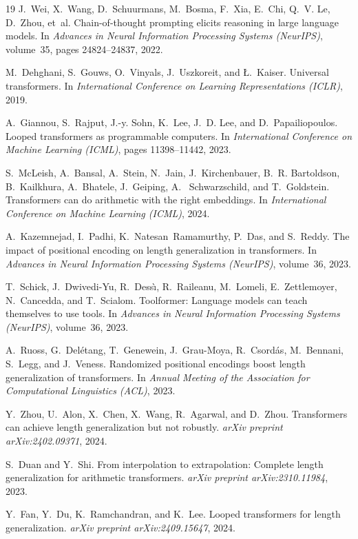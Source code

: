 \documentclass[10pt,twocolumn]{article}
\begin{document}
\begin{thebibliography}{19}
J.~Wei, X.~Wang, D.~Schuurmans, M.~Bosma, F.~Xia, E.~Chi, Q.~V. Le, D.~Zhou, et~al.
\newblock Chain-of-thought prompting elicits reasoning in large language models.
\newblock In \emph{Advances in Neural Information Processing Systems (NeurIPS)}, volume~35, pages 24824--24837, 2022.

M.~Dehghani, S.~Gouws, O.~Vinyals, J.~Uszkoreit, and \L.~Kaiser.
\newblock Universal transformers.
\newblock In \emph{International Conference on Learning Representations (ICLR)}, 2019.

A.~Giannou, S.~Rajput, J.-y. Sohn, K.~Lee, J.~D. Lee, and D.~Papailiopoulos.
\newblock Looped transformers as programmable computers.
\newblock In \emph{International Conference on Machine Learning (ICML)}, pages 11398--11442, 2023.

S.~McLeish, A.~Bansal, A.~Stein, N.~Jain, J.~Kirchenbauer, B.~R. Bartoldson, B.~Kailkhura, A.~Bhatele, J.~Geiping, A.~ Schwarzschild, and T.~Goldstein.
\newblock Transformers can do arithmetic with the right embeddings.
\newblock In \emph{International Conference on Machine Learning (ICML)}, 2024.

A.~Kazemnejad, I.~Padhi, K.~Natesan~Ramamurthy, P.~Das, and S.~Reddy.
\newblock The impact of positional encoding on length generalization in transformers.
\newblock In \emph{Advances in Neural Information Processing Systems (NeurIPS)}, volume~36, 2023.

T.~Schick, J.~Dwivedi-Yu, R.~Dess{\`\i}, R.~Raileanu, M.~Lomeli, E.~Zettlemoyer, N.~Cancedda, and T.~Scialom.
\newblock Toolformer: Language models can teach themselves to use tools.
\newblock In \emph{Advances in Neural Information Processing Systems (NeurIPS)}, volume~36, 2023.

A.~Ruoss, G.~Del{\'e}tang, T.~Genewein, J.~Grau-Moya, R.~Csord{\'a}s, M.~Bennani, S.~Legg, and J.~Veness.
\newblock Randomized positional encodings boost length generalization of transformers.
\newblock In \emph{Annual Meeting of the Association for Computational Linguistics (ACL)}, 2023.

Y.~Zhou, U.~Alon, X.~Chen, X.~Wang, R.~Agarwal, and D.~Zhou.
\newblock Transformers can achieve length generalization but not robustly.
\newblock \emph{arXiv preprint arXiv:2402.09371}, 2024.

S.~Duan and Y.~Shi.
\newblock From interpolation to extrapolation: Complete length generalization for arithmetic transformers.
\newblock \emph{arXiv preprint arXiv:2310.11984}, 2023.

Y.~Fan, Y.~Du, K.~Ramchandran, and K.~Lee.
\newblock Looped transformers for length generalization.
\newblock \emph{arXiv preprint arXiv:2409.15647}, 2024.
\end{thebibliography}
\end{document}
